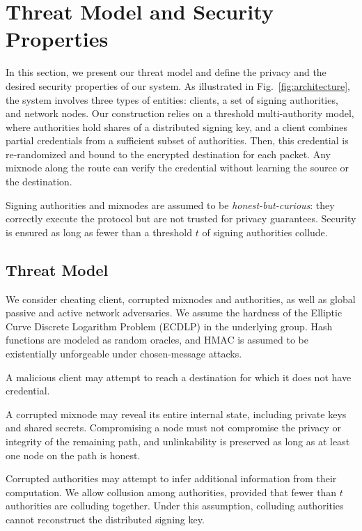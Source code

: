 
\section{Threat Model and Security Properties}\label{sec:sys_model}

In this section, we present our threat model and define the privacy and the desired security properties of our system.
As illustrated in Fig.~\ref{fig:architecture}, the system involves three types of entities: clients, a set of signing authorities, and network nodes. 
Our construction relies on a threshold multi-authority model, where authorities hold shares of a distributed signing key, and a client combines partial credentials from a sufficient subset of authorities. 
Then, this credential is re-randomized and bound to the encrypted destination for each packet. 
Any mixnode along the route can verify the credential without learning the source or the destination.

Signing authorities and mixnodes are assumed to be \emph{honest-but-curious}: they correctly execute the protocol but are not trusted for privacy guarantees. 
Security is ensured as long as fewer than a threshold $t$ of signing authorities collude.

\subsection{Threat Model}

We consider cheating client, corrupted mixnodes and authorities, as well as global passive and active network adversaries. 
We assume the hardness of the Elliptic Curve Discrete Logarithm Problem (ECDLP) in the underlying group.
Hash functions are modeled as random oracles, and HMAC is assumed to be existentially unforgeable under chosen-message attacks.

\smallskip
{}
A malicious client may attempt to reach a destination for which it does not have credential.

\smallskip
{}
A corrupted mixnode may reveal its entire internal state, including private keys and shared secrets.
Compromising a node must not compromise the privacy or integrity of the remaining path, and unlinkability is preserved as long as at least one node on the path is honest.

\smallskip
{}
Corrupted authorities may attempt to infer additional information from their computation.
We allow collusion among authorities, provided that fewer than $t$ authorities are colluding together.
Under this assumption, colluding authorities cannot reconstruct the distributed signing key.

